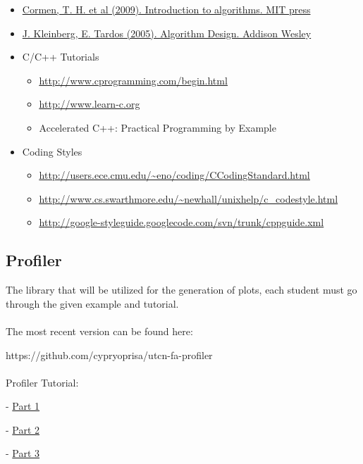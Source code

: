 \documentclass[../en-fa-lab.tex]{subfiles}
\begin{document}
\begin{itemize}
\item
    \href{https://drive.google.com/drive/folders/12NX3D8DLrPuU-9ffI9MjnoKUNjjftWRg?usp=sharing}{Cormen, T. H. et al (2009). Introduction to algorithms. MIT press}
  
\item
    \href{https://drive.google.com/drive/folders/12NX3D8DLrPuU-9ffI9MjnoKUNjjftWRg?usp=sharing}{J. Kleinberg, E. Tardos (2005). Algorithm Design. Addison Wesley}

\item
  C/C++ Tutorials

  \begin{itemize}
  \item
    \href{http://www.cprogramming.com/begin.html}{\ul{http://www.cprogramming.com/begin.html}}
  \item
    \href{http://www.learn-c.org}{\ul{http://www.learn-c.org}}
  \item
    Accelerated C++: Practical Programming by Example
  \end{itemize}
\item
  Coding Styles

  \begin{itemize}
  \item
    \href{http://users.ece.cmu.edu/~eno/coding/CCodingStandard.html}{\ul{http://users.ece.cmu.edu/\textasciitilde eno/coding/CCodingStandard.html}}
  \item
    \href{http://www.cs.swarthmore.edu/~newhall/unixhelp/c_codestyle.html}{\ul{http://www.cs.swarthmore.edu/\textasciitilde newhall/unixhelp/c\_codestyle.html}}
  \item
    \href{http://google-styleguide.googlecode.com/svn/trunk/cppguide.xml}{\ul{http://google-styleguide.googlecode.com/svn/trunk/cppguide.xml}}
  \end{itemize}
\end{itemize}


\subsection{\texorpdfstring{\textbf{Profiler}}{Profiler}}\label{profiler}
The library that will be utilized for the generation of plots, each student must go through the given example and tutorial.
\\\\
The most recent version can be found here: 

https://github.com/cypryoprisa/utcn-fa-profiler
\\\\
Profiler Tutorial:

- \href{https://youtu.be/iE4FFwdncDk}{Part 1}

- \href{https://youtu.be/vMhwBXEelSA}{Part 2}

- \href{https://youtu.be/ZOztj7aPWs4}{Part 3}
\end{document}
